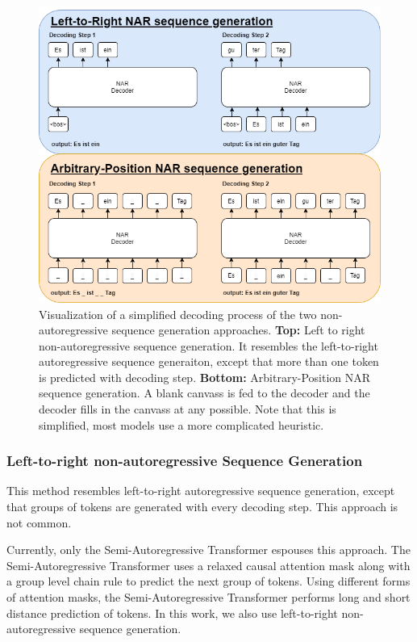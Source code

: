 \begin{figure}[hbtp!]
    \centering
    \includegraphics[width=\textwidth]{images/chap02_images/leftright_vs_arbitrary.png}
    \caption{Visualization of a simplified decoding process of the two non-autoregressive sequence generation approaches. \textbf{Top:} Left to right non-autoregressive sequence generation. It resembles the left-to-right autoregressive sequence generaiton, except that more than one token is predicted with decoding step. \textbf{Bottom:} Arbitrary-Position NAR sequence generation. A blank canvass is fed to the decoder and the decoder fills in the canvass at any possible. Note that this is simplified, most models use a more complicated heuristic.}
    \label{fig:leftright_vs_arbitrary}
\end{figure}


\subsubsection{Left-to-right non-autoregressive Sequence Generation} \label{subsubsec:sol3_iterative_generation_left2right}
This method resembles left-to-right autoregressive sequence generation, except that groups of tokens are generated with every decoding step. This approach is not common.

Currently, only the Semi-Autoregressive Transformer \cite{wang_semi-autoregressive_2018} espouses this approach. The Semi-Autoregressive Transformer uses a relaxed causal attention mask along with a group level chain rule to predict the next group of tokens. Using different forms of attention masks, the Semi-Autoregressive Transformer performs long and short distance prediction of tokens. In this work, we also use left-to-right non-autoregressive sequence generation.


